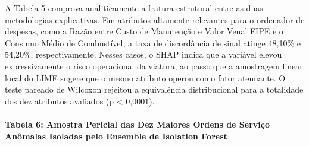 \documentclass[10pt,a4paper,journal]{article}
\begin{document}
A Tabela 5 comprova analiticamente a fratura estrutural entre as duas metodologias explicativas. Em atributos altamente relevantes para o ordenador de despesas, como a Razão entre Custo de Manutenção e Valor Venal FIPE e o Consumo Médio de Combustível, a taxa de discordância de sinal atinge 48,10\% e 54,20\%, respectivamente. Nesses casos, o SHAP indica que a variável elevou expressivamente o risco operacional da viatura, ao passo que a amostragem linear local do LIME sugere que o mesmo atributo operou como fator atenuante. O teste pareado de Wilcoxon rejeitou a equivalência distribucional para a totalidade dos dez atributos avaliados (p < 0,0001).

\paragraph{Tabela 6: Amostra Pericial das Dez Maiores Ordens de Serviço Anômalas Isoladas pelo Ensemble de Isolation Forest}
\end{document}
